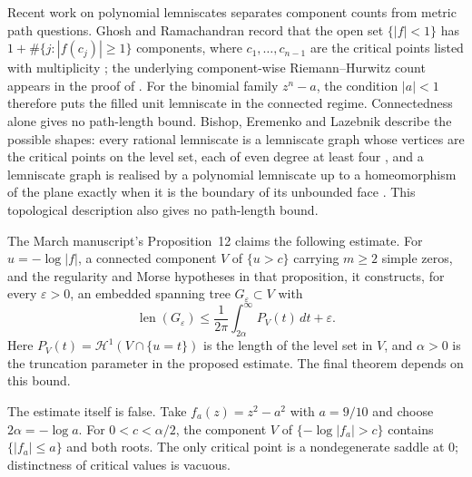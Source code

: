 Recent work on polynomial lemniscates separates component counts from metric
path questions. Ghosh and Ramachandran record that the open set
$\{|f|<1\}$ has $1+\#\{j:|f(c_j)|\ge1\}$ components, where
$c_1,\ldots,c_{n-1}$ are the critical points listed with multiplicity
\cite[Lemma~2.5]{ghosh2023}; the underlying component-wise Riemann--Hurwitz
count appears in the proof of \cite[Proposition~2.1]{eks2010}.  For the
binomial family $z^n-a$, the condition $|a|<1$ therefore puts the filled unit
lemniscate in the connected regime. Connectedness alone gives no path-length bound.
Bishop, Eremenko and Lazebnik describe the possible shapes: every rational
lemniscate is a lemniscate graph whose vertices are the critical points on the
level set, each of even degree at least four
\cite[Definition~1.2 and Proposition~2.4]{bishoperemenkolazebnik2025}, and a
lemniscate graph is realised by a polynomial lemniscate up to a homeomorphism
of the plane exactly when it is the boundary of its unbounded face
\cite[Corollary~1.6]{bishoperemenkolazebnik2025}.  This topological
description also gives no path-length bound.

The March manuscript's Proposition~12 claims the following
estimate.  For $u=-\log|f|$, a connected component $V$ of $\{u>c\}$ carrying
$m\ge2$ simple zeros, and the regularity and Morse hypotheses in that proposition, it
constructs, for every $\varepsilon>0$, an embedded spanning tree
$G_\varepsilon\subset V$ with
\[
 \operatorname{len}(G_\varepsilon)
 \le\frac1{2\pi}\int_{2\alpha}^{\infty}P_V(t)\,dt+\varepsilon.
\tag{5.1}\label{eq:prop12-bound}
\]
Here $P_V(t)=\mathcal H^1(V\cap\{u=t\})$ is the length of the level
set in $V$, and $\alpha>0$ is the truncation parameter in the proposed
estimate. The final theorem depends on this bound.

The estimate itself is false. Take $f_a(z)=z^2-a^2$ with $a=9/10$
and choose $2\alpha=-\log a$. For $0<c<\alpha/2$, the component
$V$ of $\{-\log|f_a|>c\}$ contains $\{|f_a|\le a\}$ and both roots.
The only critical point is a nondegenerate saddle at $0$; distinctness
of critical values is vacuous.

